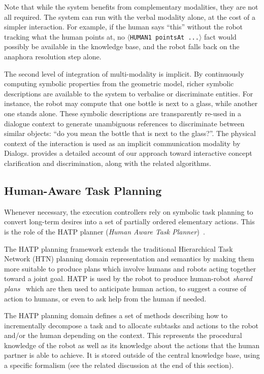 \documentclass[preprint,3p,times]{elsarticle}
\newcommand{\stmt}[1]{{\footnotesize\tt$\langle$#1\relax$\rangle$}}
\begin{document}
Note that while the system benefits from complementary modalities, they are not
all required. The system can run with the verbal modality alone, at the cost of
a simpler interaction. For example, if the human says ``this'' without the robot
tracking what the human points at, no \stmt{HUMAN1 pointsAt ...} fact would
possibly be available in the knowledge base, and the robot falls back on the
anaphora resolution step alone.

The second level of integration of multi-modality is implicit. By continuously
computing symbolic properties from the geometric model, richer symbolic
descriptions are available to the system to verbalise or discriminate entities.
For instance, the robot may compute that one bottle is next to a glass, while
another one stands alone. These symbolic descriptions are transparently
re-used in a dialogue context to generate unambiguous references to discriminate
between similar objects: ``do you mean the bottle that is next to the glass?''.
The physical context of the interaction is used as an implicit communication
modality by {\sc Dialogs}. \cite{Ros2010b} provides a detailed account of our
approach toward interactive concept clarification and discrimination, along with the
related algorithms.


\subsection{Human-Aware Task Planning}
\label{hatp}

Whenever necessary, the execution controllers rely on symbolic task planning to convert long-term
desires into a set of partially ordered elementary actions. This is the role of the HATP
planner (\emph{Human Aware Task Planner})~\cite{Alili2008,
Alili2009,Lallement2014}.

The HATP planning framework extends the traditional Hierarchical Task
Network (HTN) planning domain representation and semantics by making them more
suitable to produce plans which involve humans and robots acting together
toward a joint goal. HATP is used by the robot to produce human-robot
\emph{shared plans}~\cite{Grosz1996,Clark1996,Kemp2007} which are then used to
anticipate human action, to suggest a course of action to humans, or even to ask
help from the human if needed.

The HATP planning domain defines a set of methods describing how to
incrementally decompose a task and to allocate subtasks and actions to the robot and/or the human depending on the context. This represents the procedural knowledge of the robot as well as
its knowledge about the actions that the human partner is able to achieve. It is
stored outside of the central knowledge base, using a specific formalism (see
the related discussion at the end of this section).
\end{document}
